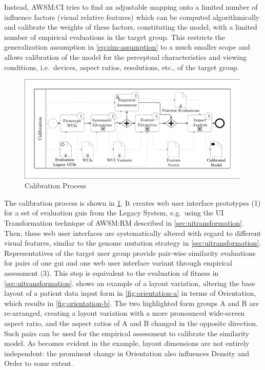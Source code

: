 Instead, AWSM:CI tries to find an adjustable mapping onto a limited number of influence factors (visual relative features) which can be computed algorithmically and calibrate the weights of these factors, constituting the model, with a limited number of empirical evaluations in the target group.
This restricts the generalization assumption in \cref{eq:sim-assumption} to a much smaller scope and allows calibration of the model for the perceptual characteristics and viewing conditions, i.e.~devices, aspect ratios, resolutions, etc., of the target group.

\begin{figure}
\hypertarget{fig:ci-calibration}{%
\centering
\includegraphics[width=0.99\textwidth]{../figures/awsm-ci-calibration.pdf}
\caption{Calibration Process}\label{fig:ci-calibration}
}
\end{figure}

The calibration process is shown in \cref{fig:ci-calibration}.
It creates \gls{web} user interface prototypes (1) for a set of evaluation \glspl{gui} from the \gls{Legacy System}, e.g.~using the UI \gls{Transformation} technique of AWSM:RM described in \cref{sec:uitransformation}.
Then, these \gls{web} user interfaces are systematically altered with regard to different visual features, similar to the genome mutation strategy in \cref{sec:uitransformation}.
Representatives of the target user group provide pair-wise similarity evaluations for pairs of one  \gls{gui} and one \gls{web} user interface variant through empirical assessment (3).
This step is equivalent to the evaluation of fitness in \cref{sec:uitransformation}.
 shows an example of a layout variation, altering the base layout of a patient data input form in \cref{fig:orientation-a} in terms of Orientation, which results in \cref{fig:orientation-b}.
The two highlighted form groups A and B are re-arranged, creating a layout variation with a more pronounced wide-screen aspect ratio, and the aspect ratios of A and B changed in the opposite direction.
Such pairs can be used for the empirical assessment to calibrate the similarity model.
As becomes evident in the example, layout dimensions are not entirely independent: the prominent change in Orientation also influences Density and Order to some extent.

